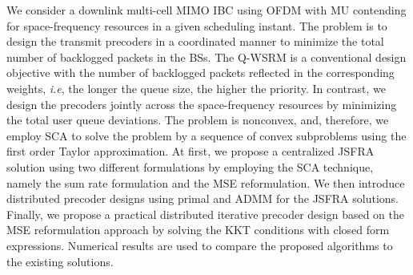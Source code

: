 We consider a downlink multi-cell \ac{MIMO} \ac{IBC} using \ac{OFDM} with \acl{MU} contending for space-frequency resources in a given scheduling instant. The problem is to design the transmit precoders in a coordinated manner to minimize the total number of backlogged packets in the \acp{BS}. The \ac{Q-WSRM} is a conventional design objective with the number of backlogged packets reflected in the corresponding weights, \textit{i.e}, the longer the queue size, the higher the priority. In contrast, we design the precoders jointly across the space-frequency resources by minimizing the total user queue deviations. The problem is nonconvex, and, therefore, we employ \ac{SCA} to solve the problem by a sequence of convex subproblems using the first order Taylor approximation. At first, we propose a centralized \ac{JSFRA} solution using two different formulations by employing the \ac{SCA} technique, namely the sum rate formulation and the \ac{MSE} reformulation. We then introduce distributed precoder designs using primal and \ac{ADMM} for the \ac{JSFRA} solutions. Finally, we propose a practical distributed iterative precoder design based on the \ac{MSE} reformulation approach by solving the \acl{KKT} conditions with closed form expressions. Numerical results are used to compare the proposed algorithms to the existing solutions.

